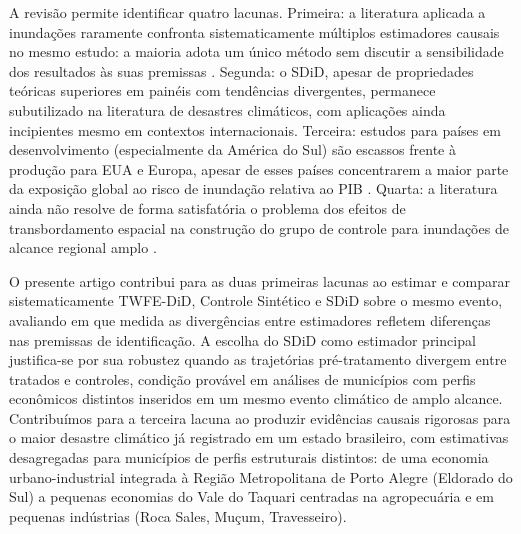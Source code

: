 \documentclass[a4paper,12pt]{article}
\begin{document}
A revisão permite identificar quatro lacunas. Primeira: a literatura aplicada a inundações
raramente confronta sistematicamente múltiplos estimadores causais no mesmo estudo: a
maioria adota um único método sem discutir a sensibilidade dos resultados às suas
premissas \cite{botzen2019}. Segunda: o SDiD, apesar de propriedades teóricas superiores
em painéis com tendências divergentes, permanece subutilizado na literatura de desastres
climáticos, com aplicações ainda incipientes mesmo em contextos internacionais. Terceira:
estudos para países em desenvolvimento (especialmente da América do Sul) são
escassos frente à produção para EUA e Europa, apesar de esses países concentrarem a
maior parte da exposição global ao risco de inundação relativa ao PIB
\cite{rentschler2022, mcdermott2022}. Quarta: a literatura ainda não resolve de forma
satisfatória o problema dos efeitos de transbordamento espacial na construção do grupo de
controle para inundações de alcance regional amplo \cite{sakaguchi2026, goujon2024}.

O presente artigo contribui para as duas primeiras lacunas ao estimar e comparar
sistematicamente TWFE-DiD, Controle Sintético e SDiD sobre o mesmo evento, avaliando
em que medida as divergências entre estimadores refletem diferenças nas premissas de
identificação. A escolha do SDiD como estimador principal justifica-se por sua robustez
quando as trajetórias pré-tratamento divergem entre tratados e controles, condição
provável em análises de municípios com perfis econômicos distintos inseridos em um
mesmo evento climático de amplo alcance. Contribuímos para a terceira lacuna ao produzir
evidências causais rigorosas para o maior desastre climático já registrado em um estado
brasileiro, com estimativas desagregadas para municípios de perfis estruturais distintos:
de uma economia urbano-industrial integrada à Região Metropolitana de Porto Alegre
(Eldorado do Sul) a pequenas economias do Vale do Taquari centradas na agropecuária e
em pequenas indústrias (Roca Sales, Muçum, Travesseiro).
\end{document}
